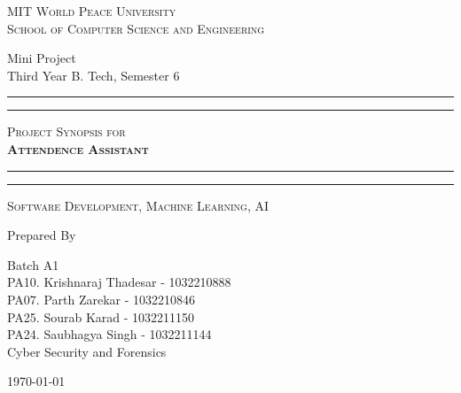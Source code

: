 \documentclass[11pt]{article}
\begin{document}
\begin{titlepage}
    \centering


    \huge\textsc{
        MIT World Peace University\\
        School of Computer Science and Engineering
    }\\

    \vspace{0.75\baselineskip} %

    \LARGE{
        Mini Project\\
        Third Year B. Tech, Semester 6
    }

    \vfill %


    \rule{\textwidth}{1.6pt}\vspace*{-\baselineskip}\vspace*{2pt}
    \rule{\textwidth}{0.6pt}
    \vspace{0.75\baselineskip} %



    \huge{\textsc{
        Project Synopsis for\\
        \textbf{Attendence Assistant}
        }} \\



    \vspace{0.5\baselineskip} %
    \rule{\textwidth}{0.6pt}\vspace*{-\baselineskip}\vspace*{2.8pt}
    \rule{\textwidth}{1.6pt}

    \vspace{1\baselineskip} %


    \LARGE\textsc{
        Software Development, Machine Learning, AI\\
    } %
    \vfill


    Prepared By
    \vspace{0.5\baselineskip} %

    \Large{
        Batch A1\\
        PA10. Krishnaraj Thadesar - 1032210888\\
        PA07. Parth Zarekar - 1032210846\\
        PA25. Sourab Karad - 1032211150\\
        PA24. Saubhagya Singh - 1032211144\\
        Cyber Security and Forensics\\
    }


    \vspace{0.5\baselineskip} %
    \today

\end{titlepage}
\end{document}
